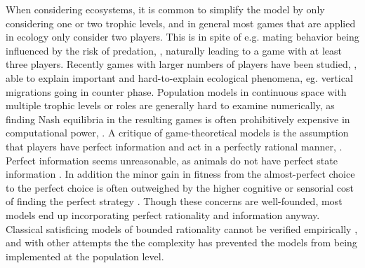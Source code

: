 When considering ecosystems, it is common to simplify the model by only considering one or two trophic levels, and in general most games that are applied in ecology only consider two players.  This is in spite of e.g. mating behavior being influenced by the risk of predation, \citep{carranza1999red,lima2009predators}, naturally leading to a game with at least three players. Recently games with larger numbers of players have been studied, \citep{pinti2019trophic}, able to explain important and hard-to-explain ecological phenomena, eg. vertical migrations going in counter phase. Population models in continuous space with multiple trophic levels or roles are generally hard to examine numerically, as finding Nash equilibria in the resulting games is often prohibitively expensive in computational power, \citep{empirical_trait,pinti2019trophic}. A critique of game-theoretical models is the assumption that players have perfect information and act in a perfectly rational manner, \citep{jones1999bounded}. Perfect information seems unreasonable, as animals do not have perfect state information \citep{simon1955behavioral}. In addition the minor gain in fitness from the almost-perfect choice to the perfect choice is often outweighed by the higher cognitive or sensorial cost of finding the perfect strategy \citep{simon1956rational, cohen2019bounded}. Though these concerns are well-founded, most models end up incorporating perfect rationality and information anyway. Classical satisficing models of bounded rationality cannot be verified empirically \citep{nonacs1993satisficing}, and with other attempts the \citep{bayesianmodel, thuijsman1995automata} the complexity has prevented the models from being implemented at the population level.




